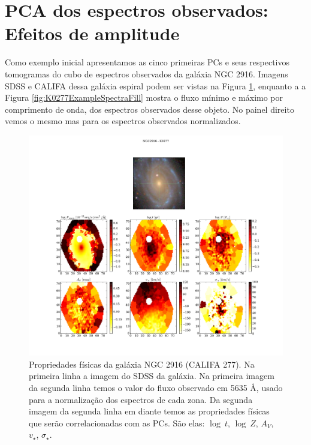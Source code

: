 \section{PCA dos espectros observados: Efeitos de amplitude}
\label{sec:PCAaplic:norm}

Como exemplo inicial apresentamos as cinco primeiras PCs e seus respectivos tomogramas do cubo de espectros observados
da galáxia NGC 2916. Imagens SDSS e CALIFA dessa galáxia espiral podem ser vistas na Figura \ref{fig:K0277apresent},
enquanto a a Figura \ref{fig:K0277ExampleSpectraFill} mostra o fluxo mínimo e máximo por comprimento de onda, dos
espectros observados desse objeto. No painel direito vemos o mesmo mas para os espectros observados normalizados.

\begin{figure}
    \includegraphics[width=1.\textwidth]{figuras/K0277-apresent.pdf}
    \caption[Propriedades f\'isicas da gal\'axia NGC 2916 (CALIFA 277).]
    {Propriedades físicas da galáxia NGC 2916 (CALIFA 277). Na primeira linha a imagem do SDSS da galáxia. Na primeira
    imagem da segunda linha temos o valor do fluxo observado em 5635 \AA, usado para a normalização dos espectros de
    cada zona. Da segunda imagem da segunda linha em diante temos as propriedades físicas que serão correlacionadas com
    as PCs. São elas: $\log\ t$, $\log\ Z$, $A_V$, $v_{\star}$, $\sigma_{\star}$.}
    \label{fig:K0277apresent}
\end{figure}

